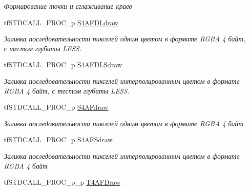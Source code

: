 \begin{DoxyCompactItemize}
\begin{DoxyCompactList}\small\item\em Формирование точки и сглаживание краев \end{DoxyCompactList}\item 
\hypertarget{structs_functions_render_c_p_u_aa5721205b0fca4935acaf788daa3d278}{tf\-S\-T\-D\-C\-A\-L\-L\-\_\-\-P\-R\-O\-C\-\_\-p \hyperlink{structs_functions_render_c_p_u_aa5721205b0fca4935acaf788daa3d278}{S4\-A\-F\-D\-Ldraw}}\label{structs_functions_render_c_p_u_aa5721205b0fca4935acaf788daa3d278}

\begin{DoxyCompactList}\small\item\em Заливка последовательности пикселей одним цветом в формате R\-G\-B\-A 4 байт, с тестом глубиты L\-E\-S\-S. \end{DoxyCompactList}\item 
\hypertarget{structs_functions_render_c_p_u_a0e6741c8d541f1165e956826dd6634c9}{tf\-S\-T\-D\-C\-A\-L\-L\-\_\-\-P\-R\-O\-C\-\_\-p \hyperlink{structs_functions_render_c_p_u_a0e6741c8d541f1165e956826dd6634c9}{S4\-A\-F\-D\-L\-Sdraw}}\label{structs_functions_render_c_p_u_a0e6741c8d541f1165e956826dd6634c9}

\begin{DoxyCompactList}\small\item\em Заливка последовательности пикселей интерполированным цветом в формате R\-G\-B\-A 4 байт, с тестом глубиты L\-E\-S\-S. \end{DoxyCompactList}\item 
\hypertarget{structs_functions_render_c_p_u_a5f28e249709e2cf15949189c15175f07}{tf\-S\-T\-D\-C\-A\-L\-L\-\_\-\-P\-R\-O\-C\-\_\-p \hyperlink{structs_functions_render_c_p_u_a5f28e249709e2cf15949189c15175f07}{S4\-A\-Fdraw}}\label{structs_functions_render_c_p_u_a5f28e249709e2cf15949189c15175f07}

\begin{DoxyCompactList}\small\item\em Заливка последовательности пикселей одним цветом в формате R\-G\-B\-A 4 байт \end{DoxyCompactList}\item 
\hypertarget{structs_functions_render_c_p_u_ae6c82804394db76dae1b2f7f31e17446}{tf\-S\-T\-D\-C\-A\-L\-L\-\_\-\-P\-R\-O\-C\-\_\-p \hyperlink{structs_functions_render_c_p_u_ae6c82804394db76dae1b2f7f31e17446}{S4\-A\-F\-Sdraw}}\label{structs_functions_render_c_p_u_ae6c82804394db76dae1b2f7f31e17446}

\begin{DoxyCompactList}\small\item\em Заливка последовательности пикселей интерполированным цветом в формате R\-G\-B\-A 4 байт \end{DoxyCompactList}\item 
\hypertarget{structs_functions_render_c_p_u_a007004ee431090bb7c3d07016a128ee2}{tf\-S\-T\-D\-C\-A\-L\-L\-\_\-\-P\-R\-O\-C\-\_\-p\-\_\-p \hyperlink{structs_functions_render_c_p_u_a007004ee431090bb7c3d07016a128ee2}{T4\-A\-F\-Draw}}\label{structs_functions_render_c_p_u_a007004ee431090bb7c3d07016a128ee2}


\end{DoxyCompactItemize}
